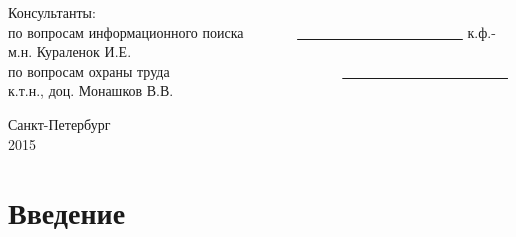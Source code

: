\documentclass[12pt,a4paper]{report}
\renewcommand{\contentsname}{Содержание}
\begin{document}
\begin{titlepage}
\begin{center}
\vspace*{0.3cm}

\begin{flushleft}
Консультанты:\\
\vspace*{0.3cm}
по вопросам информационного поиска \ \ \ \ \ \ \ \underline{ \ \ \ \ \ \ \ \ \ \ \ \ \ \ \ \ \ \ \ \ \ \ \ } к.ф.-м.н. Кураленок И.Е.\\
\vspace*{0.3cm}
по вопросам охраны труда \ \ \ \ \ \ \ \ \ \ \ \ \ \ \ \ \ \ \ \ \ \ \ \ \underline{ \ \ \ \ \ \ \ \ \ \ \ \ \ \ \ \ \ \ \ \ \ \ \ } к.т.н., доц. Монашков В.В.
\end{flushleft}

\end{center}
\vfill
\begin{center}
{\large Санкт-Петербург \\ 2015}
\end {center}
\end{titlepage}


\topmargin -1cm
\hoffset -0.5in
\textwidth 6.0in
\textheight 9.0in
\parindent 1cm

\makeatletter
{}
\apptocmd{\@makechapterhead}{}{}{}
\makeatother

\setcounter{tocdepth}{4}
\normalsize

\renewcommand{\contentsname}{Содержание}
\tableofcontents

\chapter*{Введение}


\end{document}
